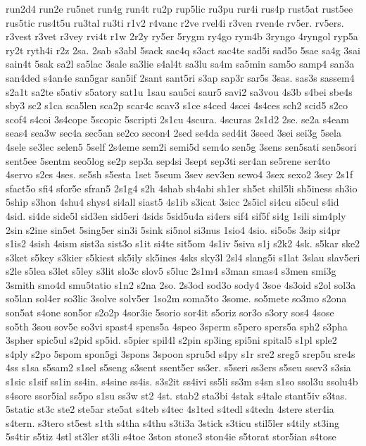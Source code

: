 {run2d4
run2e
ru5net
run4g
run4t
ru2p
rup5lic
ru3pu
rur4i
rus4p
rust5at
rust5ee
rus5tic
rus4t5u
ru3tal
ru3ti
r1v2
r4vanc
r2ve
rvel4i
r3ven
rven4e
rv5er.
rv5ers.
r3vest
r3vet
r3vey
rvi4t
r1w
2r2y
ry5er
5rygm
ry4go
rym4b
3ryngo
4ryngol
ryp5a
ry2t
ryth4i
r2z
2sa.
2sab
s3abl
5sack
sac4q
s3act
sac4te
sad5i
sad5o
5sae
sa4g
3sai
sain4t
5sak
sa2l
sa5lac
3sale
sa3lie
s4al4t
sa3lu
sa4m
sa5min
sam5o
samp4
san3a
san4ded
s4an4e
san5gar
san5if
2sant
sant5ri
s3ap
sap3r
sar5s
3sas.
sas3s
sassem4
s2a1t
sa2te
s5ativ
s5atory
sat1u
1sau
sau5ci
saur5
savi2
sa3vou
4s3b
s4bei
sbe4s
sby3
sc2
s1ca
sca5len
sca2p
scar4c
scav3
s1ce
s4ced
4scei
4s4ces
sch2
scid5
s2co
scof4
s4coi
3s4cope
5scopic
5scripti
2s1cu
4scura.
4scuras
2s1d2
2se.
se2a
s4eam
seas4
sea3w
sec4a
sec5an
se2co
secon4
2sed
se4da
sed4it
3seed
3sei
sei3g
5sela
4sele
se3lec
selen5
5self
2s4eme
sem2i
semi5d
sem4o
sen5g
3sens
sen5sati
sen5sori
sent5ee
5sentm
seo5log
se2p
sep3a
sep4si
3sept
sep3ti
ser4an
se5rene
ser4to
4servo
s2es
4ses.
se5sh
s5esta
1set
5seum
3sev
sev3en
sewo4
3sex
sexo2
3sey
2s1f
sfact5o
sfi4
sfor5e
sfran5
2s1g4
s2h
4shab
sh4abi
sh1er
sh5et
shil5li
sh5iness
sh3io
5ship
s3hon
4shu4
shys4
si4all
siast5
4s1ib
s3icat
3sicc
2s5icl
si4cu
si5cul
s4id
4sid.
si4de
side5l
sid3en
sid5eri
4sids
5sid5u4a
si4ers
sif4
sif5f
si4g
1sili
sim4ply
2sin
s2ine
sin5et
5sing5er
sin3i
5sink
si5nol
si3nus
1sio4
4sio.
si5o5s
3sip
si4pr
s1is2
4sish
4sism
sist3a
sist3o
s1it
si4te
sit5om
4s1iv
5siva
s1j
s2k2
4sk.
s5kar
ske2
s3ket
s5key
s3kier
s5kiest
sk5ily
sk5ines
4sks
sky3l
2sl4
slang5i
s1lat
3slau
slav5eri
s2le
s5lea
s3let
s5ley
s3lit
slo3c
slov5
s5luc
2s1m4
s3man
smas4
s3men
smi3g
3smith
smo4d
smu5tatio
s1n2
s2na
2so.
2s3od
sod3o
sody4
3soe
4s3oid
s2ol
sol3a
so5lan
sol4er
so3lic
3solve
solv5er
1so2m
soma5to
3some.
so5mete
so3mo
s2ona
son5at
s4one
son5or
s2o2p
4sor3ie
5sorio
sor4it
s5oriz
sor3o
s3ory
sos4
4sose
so5th
3sou
sov5e
so3vi
spast4
spens5a
4speo
3sperm
s5pero
spers5a
sph2
s3pha
3spher
spic5ul
s2pid
sp5id.
s5pier
spil4l
s2pin
sp3ing
spi5ni
spital5
s1pl
sple2
s4ply
s2po
5spom
spon5gi
3spons
3spoon
spru5d
s4py
s1r
sre2
sreg5
srep5u
sre4s
4ss
s1sa
s5sam2
s1sel
s5seng
s3sent
ssent5er
ss3er.
s5seri
ss3ers
s5seu
ssev3
s3sia
s1sic
s1sif
ss1in
ss4in.
s4sine
ss4is.
s3s2it
ss4ivi
ss5li
ss3m
s4sn
s1so
ssol3u
ssolu4b
s4sore
ssor5ial
ss5po
s1su
ss3w
st2
4st.
stab2
sta3bi
4stak
s4tale
stant5iv
s3tas.
5static
st3c
ste2
ste5ar
ste5at
s4teb
s4tec
4s1ted
s4tedl
s4tedn
4stere
ster4ia
s4tern.
s3tero
st5est
s1th
s4tha
s4thu
s3ti3a
3stick
s3ticu
stil5ler
s4tily
st3ing
5s4tir
s5tiz
4stl
st3ler
st3li
s4toe
3ston
stone3
ston4ie
s5torat
stor5ian
s4tose
}
